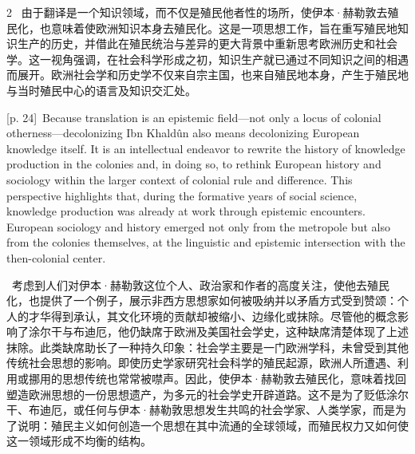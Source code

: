 \documentclass[10pt,a4paper]{article}
\begin{document}
\begin{paracol}{2}
\switchcolumn*
{\scriptsize\color{gray} [p. 24]}\ 由于翻译是一个知识领域，而不仅是殖民他者性的场所，使伊本·赫勒敦去殖民化，也意味着使欧洲知识本身去殖民化。这是一项思想工作，旨在重写殖民地知识生产的历史，并借此在殖民统治与差异的更大背景中重新思考欧洲历史和社会学。这一视角强调，在社会科学形成之初，知识生产就已通过不同知识之间的相遇而展开。欧洲社会学和历史学不仅来自宗主国，也来自殖民地本身，产生于殖民地与当时殖民中心的语言及知识交汇处。\par
\switchcolumn
{\scriptsize\color{gray} [p. 24]}\ Because translation is an epistemic field—not only a locus of colonial otherness—decolonizing Ibn Khaldûn also means decolonizing European knowledge itself. It is an intellectual endeavor to rewrite the history of knowledge production in the colonies and, in doing so, to rethink European history and sociology within the larger context of colonial rule and difference. This perspective highlights that, during the formative years of social science, knowledge production was already at work through epistemic encounters. European sociology and history emerged not only from the metropole but also from the colonies themselves, at the linguistic and epistemic intersection with the then-colonial center.\par
\switchcolumn*
{\scriptsize\color{gray} [p. 24]}\ 考虑到人们对伊本·赫勒敦这位个人、政治家和作者的高度关注，使他去殖民化，也提供了一个例子，展示非西方思想家如何被吸纳并以矛盾方式受到赞颂：个人的才华得到承认，其文化环境的贡献却被缩小、边缘化或抹除。尽管他的概念影响了涂尔干与布迪厄，他仍缺席于欧洲及美国社会学史，这种缺席清楚体现了上述抹除。此类缺席助长了一种持久印象：社会学主要是一门欧洲学科，未曾受到其他传统社会思想的影响。即使历史学家研究社会科学的殖民起源，欧洲人所遭遇、利用或挪用的思想传统也常常被噤声。因此，使伊本·赫勒敦去殖民化，意味着找回塑造欧洲思想的一份思想遗产，为多元的社会学史开辟道路。这不是为了贬低涂尔干、布迪厄，或任何与伊本·赫勒敦思想发生共鸣的社会学家、人类学家，而是为了说明：殖民主义如何创造一个思想在其中流通的全球领域，而殖民权力又如何使这一领域形成不均衡的结构。\par
\switchcolumn

\end{paracol}
\end{document}
